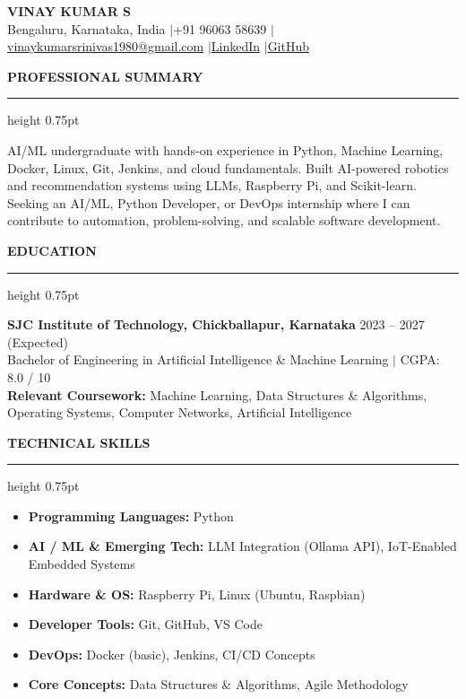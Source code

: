 \documentclass[10pt,a4paper]{article}
\newcommand{\resumesection}[1]{%
  \vspace{14pt}%
  {\large\textbf{\color{primary}#1}}\par\vspace{3pt}%
  {\color{primary}\hrule height 0.75pt}\vspace{7pt}%
}
\begin{document}
\color{bodytext}

\begin{center}
    {\LARGE \textbf{\color{primary}VINAY KUMAR S}}\\[6pt]
    Bengaluru, Karnataka, India \enspace$|$\enspace +91 96063 58639 \enspace$|$\enspace \href{mailto:vinaykumarsrinivas1980@gmail.com}{vinaykumarsrinivas1980@gmail.com} \enspace$|$\enspace \href{https://www.linkedin.com/in/vinay-kumar-37890a278/}{LinkedIn} \enspace$|$\enspace \href{https://github.com/vinaykumarsrinivas1980-blip}{GitHub}
\end{center}

\vspace{4pt}

\resumesection{PROFESSIONAL SUMMARY}
\noindent AI/ML undergraduate with hands-on experience in Python, Machine Learning, Docker, Linux, Git, Jenkins, and cloud fundamentals. Built AI-powered robotics and recommendation systems using LLMs, Raspberry Pi, and Scikit-learn. Seeking an AI/ML, Python Developer, or DevOps internship where I can contribute to automation, problem-solving, and scalable software development.

\resumesection{EDUCATION}
\noindent\textbf{SJC Institute of Technology, Chickballapur, Karnataka} \hfill 2023 -- 2027 (Expected)\\[3pt]
Bachelor of Engineering in Artificial Intelligence \& Machine Learning $|$ CGPA: 8.0 / 10\\[3pt]
\textbf{Relevant Coursework:} Machine Learning, Data Structures \& Algorithms, Operating Systems, Computer Networks, Artificial Intelligence

\resumesection{TECHNICAL SKILLS}
\begin{itemize}
    \item \textbf{Programming Languages:} Python
    \item \textbf{AI / ML \& Emerging Tech:} LLM Integration (Ollama API), IoT-Enabled Embedded Systems
    \item \textbf{Hardware \& OS:} Raspberry Pi, Linux (Ubuntu, Raspbian)
    \item \textbf{Developer Tools:} Git, GitHub, VS Code
    \item \textbf{DevOps:} Docker (basic), Jenkins, CI/CD Concepts
    \item \textbf{Core Concepts:} Data Structures \& Algorithms, Agile Methodology
\end{itemize}
\end{document}
